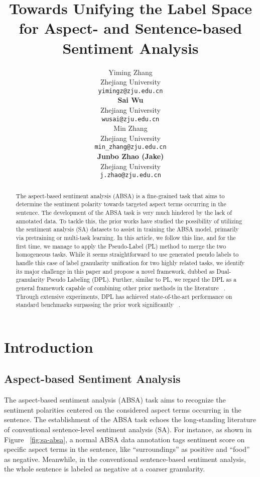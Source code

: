\documentclass[11pt]{article}
\title{Towards Unifying the Label Space for Aspect- and Sentence-based Sentiment Analysis}
\author{Yiming Zhang \\ Zhejiang University \\ \texttt{yimingz@zju.edu.cn} \\
        {\bf Sai Wu} \\ Zhejiang University \\ \texttt{wusai@zju.edu.cn} \\
        \And  Min Zhang \\ Zhejiang University \\ \texttt{min\_zhang@zju.edu.cn} \\
        {\bf Junbo Zhao (Jake)} \\ Zhejiang University \\ \texttt{j.zhao@zju.edu.cn}}
\begin{document}
\maketitle
\begin{abstract}
The aspect-based sentiment analysis (ABSA) is a fine-grained task that aims to determine the sentiment polarity towards targeted aspect terms occurring in the sentence.
The development of the ABSA task is very much hindered by the lack of annotated data.
To tackle this, the prior works have studied the possibility of utilizing the sentiment analysis (SA) datasets to assist in training the ABSA model, primarily via pretraining or multi-task learning.
In this article, we follow this line, and for the first time, we manage to apply the Pseudo-Label (PL) method to merge the two homogeneous tasks. 
While it seems straightforward to use generated pseudo labels to handle this case of label granularity unification for two highly related tasks, we identify its major challenge in this paper and propose a novel framework, dubbed as Dual-granularity Pseudo Labeling (DPL).
Further, similar to PL, we regard the DPL as a general framework capable of combining other prior methods in the literature ~\cite{rietzler2019adapt,bai2020investigating}.
Through extensive experiments, DPL has achieved state-of-the-art performance on standard benchmarks surpassing the prior work significantly ~\cite{liu2021pre}.













\end{abstract}

\section{Introduction}






\subsection{Aspect-based Sentiment Analysis}
The aspect-based sentiment analysis (ABSA) task aims to recognize the sentiment polarities centered on the considered aspect terms occurring in the sentence.
The establishment of the ABSA task echoes the long-standing literature of conventional sentence-level sentiment analysis (SA).
For instance, as shown in Figure ~\ref{fig:sa-absa}, a normal ABSA data annotation tags sentiment score on specific aspect terms in the sentence, like ``surroundings'' as positive and ``food'' as negative. Meanwhile, in the conventional sentence-based sentiment analysis, the whole sentence is labeled as negative at a coarser granularity.
\end{document}
